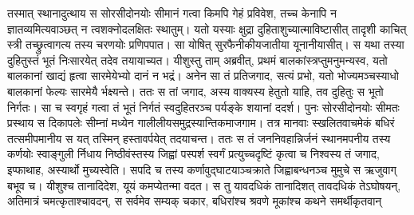 \vakya तस्मात् स्थानादुत्थाय स सोरसीदोनयोः सीमानं गत्वा किमपि गेहं प्रविवेश, तच्च केनापि न ज्ञातव्यमित्यवाञ्छत् न त्वशक्नोदलक्षितः स्थातुम्।
\vakya यतो यस्याः क्षुद्रा दुहिताशुच्यात्माविष्टासीत् तादृशी काचित् स्त्री तच्छ्रुत्वागत्य तस्य चरणयोः प्रणिपपात। सा योषित् सुरफैनीकीयजातीया यूनानीयासीत्।
\vakya स यथा तस्या दुहितुस्तं भूतं निःसारयेत् तदेव तयायाच्यत।
\vakya यीशुस्तु ताम् अब्रवीत्, प्रथमं बालकांस्त्रप्तुमनुमन्यस्व, यतो बालकानां खाद्यं हृत्वा सारमेयेभ्यो दानं न भद्रं।
\vakya अनेन सा तं प्रतिजगाद, सत्यं प्रभो, यतो भोज्यमञ्चस्याधो बालकानां फेल्यः सारमेयै र्भक्ष्यन्ते।
\vakya ततः स तां जगाद, अस्य वाक्यस्य हेतुतो याहि, तव दुहितुः स भूतो निर्गतः।
\vakya सा च स्वगृहं गत्वा तं भूतं निर्गतं स्वदुहितरञ्च पर्यङ्के शयानां ददर्श।
\vakya पुनः सोरसीदोनयोः सीमतः प्रस्थाय स दिकापलेः सीम्नां मध्येन गालीलीयसमुद्रस्यान्तिकमाजगाम।
\vakya तत्र मानवाः स्खलितवाचमेकं बधिरं तत्समीपमानीय स यत् तस्मिन् हस्तावर्पयेत् तदयाचन्त।
\vakya ततः स तं जननिवहान्निर्जनं स्थानमपनीय तस्य कर्णयोः स्वाङ्गुली र्निधाय निष्ठीवंस्तस्य जिह्वां पस्पर्श
\vakya स्वर्गं प्रत्युच्चदृष्टिं कृत्वा च निश्वस्य तं जगाद, इप्फाथाह, अस्यार्थो मुच्यस्वेति।
\vakya सपदि च तस्य कर्णावुद्घाटयाञ्चक्राते जिह्वाबन्धनञ्च मुमुचे स ऋजुवाग् बभूव च।
\vakya यीशुश्च तानादिदेश, यूयं कमप्येतन्मा वदत।
\vakya स तु यावदधिकं तानादिशत् तावदधिकं तेऽघोषयन्, अतिमात्रं चमत्कृताश्चावदन्, स सर्वमेव सम्यक् चकार, बधिरांश्च श्रवणे मूकांश्च कथने समर्थीकृतवान्\eoc